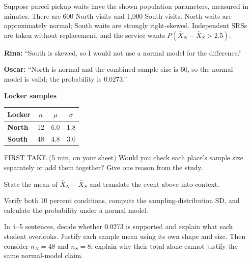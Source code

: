 \documentclass[14pt]{extarticle}
\begin{document}
\pagestyle{empty}


\noindent\begin{minipage}[t]{0.57\linewidth}
\vspace{0pt}
Suppose parcel pickup waits have the shown population parameters, measured in minutes. There are 600 North visits and 1,000 South visits. North waits are approximately normal; South waits are strongly right-skewed. Independent SRSs are taken without replacement, and the service wants $P(\bar X_N-\bar X_S>2.5)$.\par\smallskip \textbf{Rina:} ``South is skewed, so I would not use a normal model for the difference.''\par \textbf{Oscar:} ``North is normal and the combined sample size is 60, so the normal model is valid; the probability is $0.0273$.''\par
\end{minipage}\hfill
\begin{minipage}[t]{0.40\linewidth}
\vspace{0pt}
\begin{center}
\textbf{Locker samples}\par\smallskip
\begin{tabular}{|l|c|c|c|}
\hline
\textbf{Locker} & \textbf{$n$} & \textbf{$\mu$} & \textbf{$\sigma$} \\ \hline
\textbf{North} & 12 & 6.0 & 1.8 \\ \hline
\textbf{South} & 48 & 4.8 & 3.0 \\ \hline
\end{tabular}
\end{center}
\end{minipage}

\begin{firsttakebox}{FIRST TAKE (5 min, on your sheet)}
Would you check each place's sample size separately or add them together? Give one reason from the study.
\end{firsttakebox}

\begin{description}[leftmargin=1.15in, labelwidth=1in, itemsep=2pt, topsep=2pt]
  \item[\dokbadge{1}~(a)] State the mean of $\bar X_N-\bar X_S$ and translate the event above into context.
  \item[\dokbadge{2}~(b)] Verify both 10 percent conditions, compute the sampling-distribution SD, and calculate the probability under a normal model.
  \item[\dokbadge{3}~(c)] In 4--5 sentences, decide whether 0.0273 is supported and explain what each student overlooks. Justify each sample mean using its own shape and size. Then consider $n_N=48$ and $n_S=8$: explain why their total alone cannot justify the same normal-model claim.
\end{description}
\end{document}
